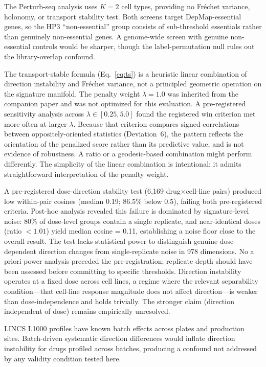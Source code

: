 \documentclass[11pt]{article}
\begin{document}
The Perturb-seq analysis uses $K = 2$ cell types, providing no Fr\'echet
variance, holonomy, or transport stability test. Both screens target
DepMap-essential genes, so the HP3 ``non-essential'' group consists of
sub-threshold essentials rather than genuinely non-essential genes. A
genome-wide screen with genuine non-essential controls would be sharper,
though the label-permutation null rules out the library-overlap confound.

The transport-stable formula (Eq.~\ref{eq:ts}) is a heuristic
linear combination of direction instability and Fr\'echet variance, not a
principled geometric operation on the signature manifold. The penalty
weight $\lambda = 1.0$ was inherited from the companion paper
\citep{tower2026drug} and was not optimized for this evaluation. A pre-registered sensitivity
analysis across $\lambda \in [0.25, 5.0]$ found the registered win
criterion met more often at larger $\lambda$. Because that criterion
compares signed correlations between oppositely-oriented statistics
(Deviation~6), the pattern reflects the orientation of the penalized score
rather than its predictive value, and is not evidence of robustness.
A ratio or a geodesic-based combination might perform differently.
The simplicity of the linear combination is intentional: it admits
straightforward interpretation of the penalty weight.

A pre-registered dose-direction stability test (6{,}169
drug$\times$cell-line pairs) produced low within-pair cosines (median
0.19; 86.5\% below 0.5), failing both pre-registered criteria. Post-hoc
analysis revealed this failure is dominated by signature-level noise:
80\% of dose-level groups contain a single replicate, and
near-identical doses (ratio $< 1.01$) yield median cosine = 0.11,
establishing a noise floor close to the overall result. The test lacks
statistical power to distinguish genuine dose-dependent direction
changes from single-replicate noise in 978 dimensions. No a priori
power analysis preceded the pre-registration; replicate depth should
have been assessed before committing to specific thresholds.
Direction instability operates at a fixed dose across cell lines, a
regime where the relevant separability condition---that cell-line
response magnitude does not affect direction---is weaker than
dose-independence and holds trivially. The stronger claim (direction
independent of dose) remains empirically unresolved.

LINCS L1000 profiles have known batch effects across plates and
production sites. Batch-driven systematic direction differences would
inflate direction instability for drugs profiled across batches,
producing a confound not addressed by any validity condition tested here.
\end{document}
